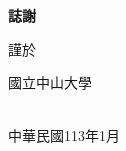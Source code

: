 {}
\begin{center}
  {\bfseries\chinnesesize 誌謝}
\end{center}

\blindtext

\vfill
\begin{flushright}
  \noindent
  [姓名]\hspace{2em}謹於

  \vspace{-6mm}
  國立中山大學
  \vspace{-6mm}

  \noindent \\
  中華民國113年1月

\end{flushright}


\clearpage